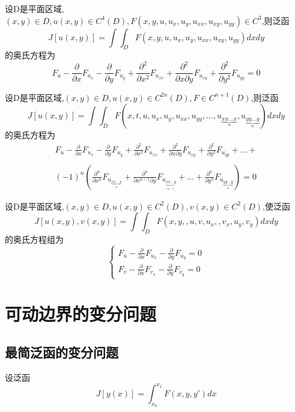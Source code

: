 \documentclass{book}
\begin{document}
\begin{corollary}
设D是平面区域,$(x,y) \in D ,u(x,y) \in C^4(D),F(x,y,u,u_x,u_y,u_{xx},u_{xy},u_{yy}) \in C^3$,则泛函
$$
J[u(x,y)]=\int\int_{D}F(x,y,u,u_x,u_y,u_{xx},u_{xy},u_{yy})dxdy
$$
的奥氏方程为
$$
F_u -\frac{\partial}{\partial x}F_{u_x}-\frac{\partial}{\partial y}F_{u_y}+ \frac{\partial^2}{\partial x^2}F_{u_{xx}} + \frac{\partial^2}{\partial x \partial y}F_{u_{xy}} + \frac{\partial^2}{\partial y^2}F_{u_{yy}} = 0
$$
\end{corollary}

\begin{corollary}
设D是平面区域,$(x,y) \in D, u(x,y) \in C^{2n}(D),F \in C^{n+1}(D)$,则泛函
$$
J[u(x,y)]=\int\int_{D}F(x,t,u,u_x,u_y,u_{xx},u_{yy}, \ldots , u_{\underbrace{xx \dots x}_{n}},u_{\underbrace{yy \dots y}_{n}})dxdy
$$
的奥氏方程为
$$
\begin{array}{c}
   F_u -\frac{\partial}{\partial x}F_{u_x}-\frac{\partial}{\partial y}F_{u_y}+ \frac{\partial^2}{\partial x^2}F_{u_{xx}} + \frac{\partial^2}{\partial x \partial y}F_{u_{xy}} + \frac{\partial^2}{\partial y^2}F_{u_{yy}} + \dots +  \\
 \\
   (-1)^n (
\frac{\partial^n }{\partial x^n}F_{u_{\underbrace{xx \dots x}_{n}}}+
\frac{\partial^n }{\partial x^{n-1}\partial y}F_{u_{\underbrace{xx \dots y}_{n-1}}}+
\dots+
\frac{\partial^n }{\partial y^n}F_{u_{\underbrace{yy \dots y}_{n}}})
= 0
\end{array}
$$
\end{corollary}

\begin{corollary}
设D是平面区域,$(x,y) \in D ,u(x,y) \in C^2(D),v(x,y) \in C^2(D)$,使泛函
$$
J[u(x,y),v(x,y)]=\int\int_{D}F(x,y,,u,v,u_x,,v_x,u_y,v_y)dxdy
$$
的奥氏方程组为
$$
\left\{
  \begin{array}{ll}
   F_u -\frac{\partial}{\partial x}F_{u_x}-\frac{\partial}{\partial y}F_{u_y} = 0 \\
   F_v -\frac{\partial}{\partial x}F_{v_x}-\frac{\partial}{\partial y}F_{v_y} = 0
  \end{array}
\right.
$$
\end{corollary}

\section{可动边界的变分问题}
\subsection{最简泛函的变分问题}
设泛函
\begin{equation}
  J[y(x)]=\int_{x_0}^{x_1}F(x,y,y')dx
\label{equation.function.simple-general}
\end{equation}
\end{document}
